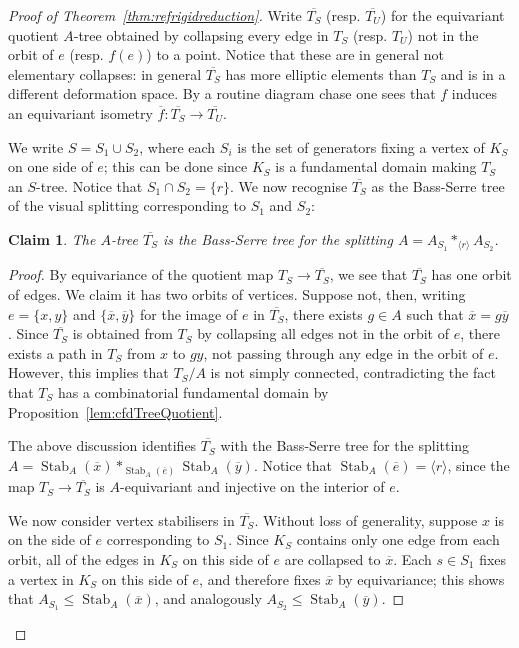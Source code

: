\documentclass[svgnames]{amsart}
\theoremstyle{plain}
\newtheorem{claim}[thm]{Claim}
\theoremstyle{definition}
\newenvironment{claimproof}{\renewcommand{\qedsymbol}{$\blacksquare$}\begin{proof}}{\end{proof}}
\newcommand{\Stab}[2]{\operatorname{Stab}_{#1}\left(#2\right)}
\begin{document}
\begin{proof}[Proof of Theorem~\ref{thm:refrigidreduction}]
    Write $\overline{T_S}$ (resp. $\overline{T_U}$) for the equivariant quotient $A$-tree obtained by collapsing every edge in $T_S$ (resp. $T_U$) not in the orbit of $e$ (resp. $f(e)$) to a point. Notice that these are in general not elementary collapses: in general $\overline{T_S}$ has more elliptic elements than $T_S$ and is in a different deformation space. By a routine diagram chase one sees that $f$ induces an equivariant isometry $\overline{f}\colon \overline{T_S}\to \overline{T_U}$.

    We write $S = S_1 \cup S_2$, where each $S_i$ is the set of generators fixing a vertex of $K_S$ on one side of $e$; this can be done since $K_S$ is a fundamental domain making $T_S$ an $S$-tree. Notice that $S_1 \cap S_2 = \{r\}$. We now recognise $\overline{T_S}$ as the Bass-Serre tree of the visual splitting corresponding to $S_1$ and $S_2$:

    \begin{claim}\label{claim:collapsedBassSerreTree}
        The $A$-tree $\overline{T_S}$ is the Bass-Serre tree for the splitting $A = A_{S_1} *_{\langle r \rangle} A_{S_2} $.
    \end{claim}
    \begin{claimproof}
        By equivariance of the quotient map $T_S\to \overline{T_S}$, we see that $\overline{T_S}$ has one orbit of edges. We claim it has two orbits of vertices. Suppose not, then, writing $e = \{x,y\}$ and $\{\overline x,\overline y\}$ for the image of $e$ in $\overline{T_S}$, there exists $g\in A$ such that $\overline x=g\overline y$. Since $\overline{T_S}$ is obtained from $T_S$ by collapsing all edges not in the orbit of $e$, there exists a path in $T_S$ from $x$ to $gy$, not passing through any edge in the orbit of $e$. However, this implies that $T_S / A$ is not simply connected, contradicting the fact that $T_S$ has a combinatorial fundamental domain by Proposition~\ref{lem:cfdTreeQuotient}.

        The above discussion identifies $\overline{T_S}$ with the Bass-Serre tree for the splitting $A = \Stab{A}{\overline{x}} *_{\Stab{A}{\overline{e}}} \Stab{A}{\overline{y}}$.
        Notice that $\Stab{A}{\overline{e}} = \langle r \rangle$, since the map $T_S\to \overline{T_S}$ is $A$-equivariant and injective on the interior of $e$.

        We now consider vertex stabilisers in $\overline{T_S}$. Without loss of generality, suppose $x$ is on the side of $e$ corresponding to $S_1$. Since $K_S$ contains only one edge from each orbit, all of the edges in $K_S$ on this side of $e$ are collapsed to $\overline{x}$. Each $s \in S_1$ fixes a vertex in $K_S$ on this side of $e$, and therefore fixes $\overline{x}$ by equivariance; this shows that $A_{S_1} \leq \Stab{A}{\overline{x}}$, and analogously $A_{S_2} \leq \Stab{A}{\overline{y}}$.


\end{claimproof}
\end{proof}
\end{document}
